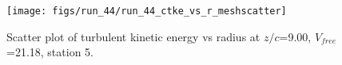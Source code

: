\begin{figure}[H]
\centering
\texttt{[image: figs/run\_44/run\_44\_ctke\_vs\_r\_meshscatter]}
\caption{Scatter plot of turbulent kinetic energy vs radius at $z/c$=9.00, $V_{free}$=21.18, station 5.}
\label{fig:run_44_ctke_vs_r_meshscatter}
\end{figure}


